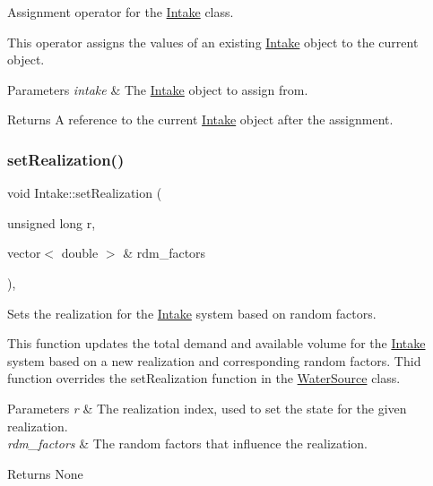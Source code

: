 Assignment operator for the \mbox{\hyperlink{classIntake}{Intake}} class. 

This operator assigns the values of an existing \mbox{\hyperlink{classIntake}{Intake}} object to the current object.


\begin{DoxyParams}{Parameters}
{\em intake} & The \mbox{\hyperlink{classIntake}{Intake}} object to assign from.\\
\hline
\end{DoxyParams}
\begin{DoxyReturn}{Returns}
A reference to the current \mbox{\hyperlink{classIntake}{Intake}} object after the assignment. 
\end{DoxyReturn}
\mbox{\label{classIntake_a879c4c780a4d21606e848f57464cf3b6}} 
\subsubsection{\texorpdfstring{set\+Realization()}{setRealization()}}
{\footnotesize\ttfamily void Intake\+::set\+Realization (\begin{DoxyParamCaption}\item[{unsigned long}]{r,  }\item[{vector$<$ double $>$ \&}]{rdm\+\_\+factors }\end{DoxyParamCaption})\hspace{0.3cm}{\ttfamily [override]}, {\ttfamily [virtual]}}



Sets the realization for the \mbox{\hyperlink{classIntake}{Intake}} system based on random factors. 

This function updates the total demand and available volume for the \mbox{\hyperlink{classIntake}{Intake}} system based on a new realization and corresponding random factors. Thid function overrides the set\+Realization function in the \mbox{\hyperlink{classWaterSource}{Water\+Source}} class.


\begin{DoxyParams}{Parameters}
{\em r} & The realization index, used to set the state for the given realization. \\
\hline
{\em rdm\+\_\+factors} & The random factors that influence the realization.\\
\hline
\end{DoxyParams}
\begin{DoxyReturn}{Returns}
None 
\end{DoxyReturn}


